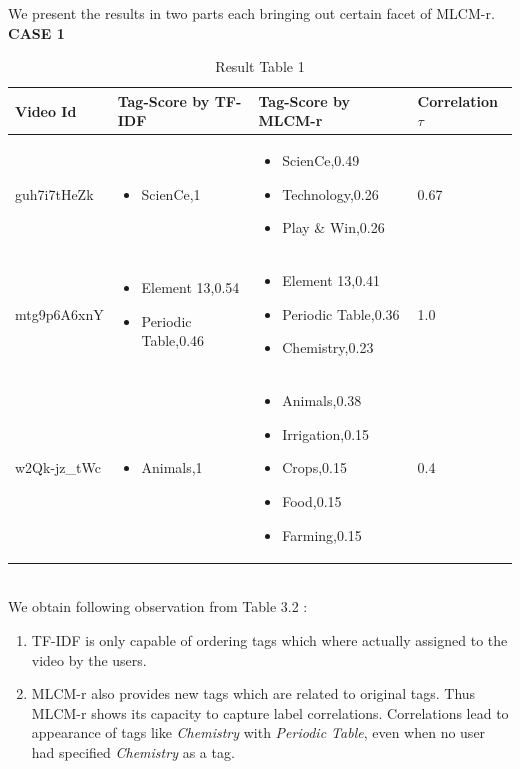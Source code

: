 \documentclass[12pt]{report}
\begin{document}
We present the results in two parts each bringing out certain facet of MLCM-r.\vspace{0.5em}
\textbf{CASE 1}\\
\begin{table}[htbp]\caption{Result Table 1}
\begin{center}%
\begin{tabular}{p{3cm} | p{5cm} | p{5cm} | p{3cm}}
\toprule
Video Id & Tag-Score by TF-IDF & Tag-Score by MLCM-r & Correlation $\tau$\\
\hline
guh7i7tHeZk & 
\begin{itemize}
\item ScienCe,1
\end{itemize} & 
\begin{itemize}
\item ScienCe,0.49
\item Technology,0.26
\item Play \& Win,0.26
\end{itemize} & 0.67\\
\hline
mtg9p6A6xnY & 
\begin{itemize}
\item Element 13,0.54
\item Periodic Table,0.46
\end{itemize} & 
\begin{itemize}
\item Element 13,0.41
\item Periodic Table,0.36
\item Chemistry,0.23
\end{itemize} & 1.0\\
\hline
w2Qk-jz\_tWc &
\begin{itemize}
\item Animals,1
\end{itemize} &
\begin{itemize}
\item Animals,0.38 
\item Irrigation,0.15 
\item Crops,0.15 
\item Food,0.15 
\item Farming,0.15
\end{itemize} &
0.4\\
\bottomrule
\end{tabular}
\end{center}
\label{tab:ResultTable1}
\end{table}
\vspace{1em}\\
We obtain following observation from Table 3.2 :
\begin{enumerate}
\item TF-IDF is only capable of ordering tags which where actually assigned to the video by the users.
\item MLCM-r also provides new tags which are related to original tags. Thus MLCM-r shows its capacity to capture label correlations. Correlations lead to appearance of tags like \emph{Chemistry} with \emph{Periodic Table}, even when no user had specified \emph{Chemistry} as a tag.
\end{enumerate}
\end{document}

